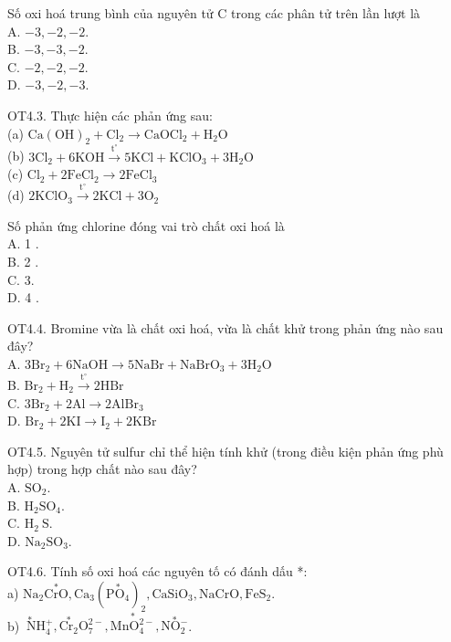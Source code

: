 \documentclass[10pt]{article}
\begin{document}
Số oxi hoá trung bình của nguyên tử C trong các phân tử trên lần lượt là\\
A. $-3,-2,-2$.\\
B. $-3,-3,-2$.\\
C. $-2,-2,-2$.\\
D. $-3,-2,-3$.

OT4.3. Thực hiện các phản ứng sau:\\
(a) $\mathrm{Ca}(\mathrm{OH})_{2}+\mathrm{Cl}_{2} \longrightarrow \mathrm{CaOCl}_{2}+\mathrm{H}_{2} \mathrm{O}$\\
(b) $3 \mathrm{Cl}_{2}+6 \mathrm{KOH} \xrightarrow{\mathrm{t}^{\circ}} 5 \mathrm{KCl}+\mathrm{KClO}_{3}+3 \mathrm{H}_{2} \mathrm{O}$\\
(c) $\mathrm{Cl}_{2}+2 \mathrm{FeCl}_{2} \longrightarrow 2 \mathrm{FeCl}_{3}$\\
(d) $2 \mathrm{KClO}_{3} \xrightarrow{\mathrm{t}^{\circ}} 2 \mathrm{KCl}+3 \mathrm{O}_{2}$

Số phản ứng chlorine đóng vai trò chất oxi hoá là\\
A. 1 .\\
B. 2 .\\
C. 3.\\
D. 4 .

OT4.4. Bromine vừa là chất oxi hoá, vừa là chất khử trong phản ứng nào sau đây?\\
A. $3 \mathrm{Br}_{2}+6 \mathrm{NaOH} \longrightarrow 5 \mathrm{NaBr}+\mathrm{NaBrO}_{3}+3 \mathrm{H}_{2} \mathrm{O}$\\
B. $\mathrm{Br}_{2}+\mathrm{H}_{2} \xrightarrow{\mathrm{t}^{\circ}} 2 \mathrm{HBr}$\\
C. $3 \mathrm{Br}_{2}+2 \mathrm{Al} \rightarrow 2 \mathrm{AlBr}_{3}$\\
D. $\mathrm{Br}_{2}+2 \mathrm{KI} \rightarrow \mathrm{I}_{2}+2 \mathrm{KBr}$

OT4.5. Nguyên tử sulfur chỉ thể hiện tính khử (trong điều kiện phản ứng phù hợp) trong hợp chất nào sau đây?\\
A. $\mathrm{SO}_{2}$.\\
B. $\mathrm{H}_{2} \mathrm{SO}_{4}$.\\
C. $\mathrm{H}_{2} \mathrm{~S}$.\\
D. $\mathrm{Na}_{2} \mathrm{SO}_{3}$.

OT4.6. Tính số oxi hoá các nguyên tố có đánh dấu *:\\
a) $\mathrm{Na}_{2} \stackrel{*}{\mathrm{CrO}}, \mathrm{Ca}_{3}\left(\stackrel{*}{\mathrm{PO}_{4}}\right)_{2}, \mathrm{CaSiO}_{3}, \mathrm{NaCrO}, \mathrm{FeS}_{2}$.\\
b) $\stackrel{*}{\mathrm{~N}} \mathrm{H}_{4}^{+}, \stackrel{*}{\mathrm{Cr}_{2}} \mathrm{O}_{7}^{2-}, \stackrel{*}{\mathrm{MnO}_{4}^{2-}}, \stackrel{*}{\mathrm{NO}_{2}^{-}}$.
\end{document}
